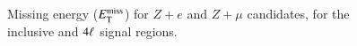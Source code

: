 \begin{appendices}
\begin{figure}[htb]
{  }
   \\
  \caption{Missing energy ($E_{\text{T}}^{\text{miss}}$) for $Z+e$ and $Z+\mu$ candidates, for the inclusive and $4\ell$ signal regions.}
  \label{fig:SR-ETMiss-1}
\end{figure}

\clearpage


\end{appendices}
